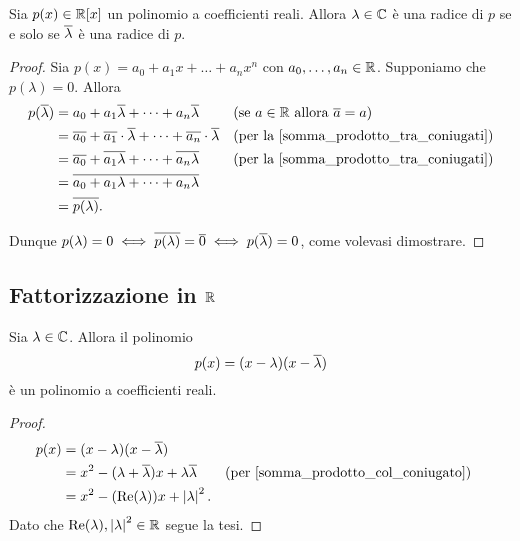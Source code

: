 \begin{proposition}\label{radici_coniugate_a_due_a_due}
    Sia $p(x) \in \mathbb{R}[x]$ un polinomio a coefficienti reali. Allora $\lambda \in \mathbb{C}$ è una radice di $p$ se e solo se $\overline{\lambda}$ è una radice di $p$.
\end{proposition}
\begin{proof}
    Sia $p(x) = a_0 + a_1x + \dots + a_nx^n$ con $a_0, \dots, a_n \in \mathbb{R}$. Supponiamo che $p(\lambda) = 0$. Allora \begin{align*}
        p(\overline{\lambda}) &= a_0 + a_1\overline{\lambda} + \dots + a_n\overline{\lambda} &&\text{(se $a \in \mathbb{R}$ allora $\overline{a} = a$)}\\
        &= \overline{a_0} + \overline{a_1}\cdot\overline{\lambda} + \dots + \overline{a_n}\cdot\overline{\lambda} &&\text{(per la \ref{somma_prodotto_tra_coniugati})}\\
        &= \overline{a_0} + \overline{a_1\lambda} + \dots + \overline{a_n\lambda} &&\text{(per la \ref{somma_prodotto_tra_coniugati})}\\
        &= \overline{a_0 + a_1\lambda + \dots + a_n\lambda} \\
        &= \overline{p(\lambda)}.
    \end{align*}

    Dunque $p(\lambda) = 0 \iff \overline{p(\lambda)} = \overline{0} \iff p(\overline{\lambda}) = 0$, come volevasi dimostrare.
\end{proof}

\subsection{Fattorizzazione in $\mathbb{R}$}

\begin{lemma}\label{(x-l)(x-conj(l))_in_R}
    Sia $\lambda \in \mathbb{C}$. Allora il polinomio \[
        p(x) = (x-\lambda)(x-\overline{\lambda})    
    \] è un polinomio a coefficienti reali.
\end{lemma}
\begin{proof}
    \begin{align*}
        p(x) &= (x-\lambda)(x-\overline{\lambda})\\
        &= x^2 - (\lambda + \overline{\lambda})x + \lambda\overline{\lambda} &&\text{(per \ref{somma_prodotto_col_coniugato})}\\
        &= x^2 - (\operatorname{Re}(\lambda))x + \left|\lambda\right|^2.
    \end{align*}
    Dato che $\operatorname{Re}(\lambda), \left|\lambda\right|^2 \in \mathbb{R}$ segue la tesi.
\end{proof}

